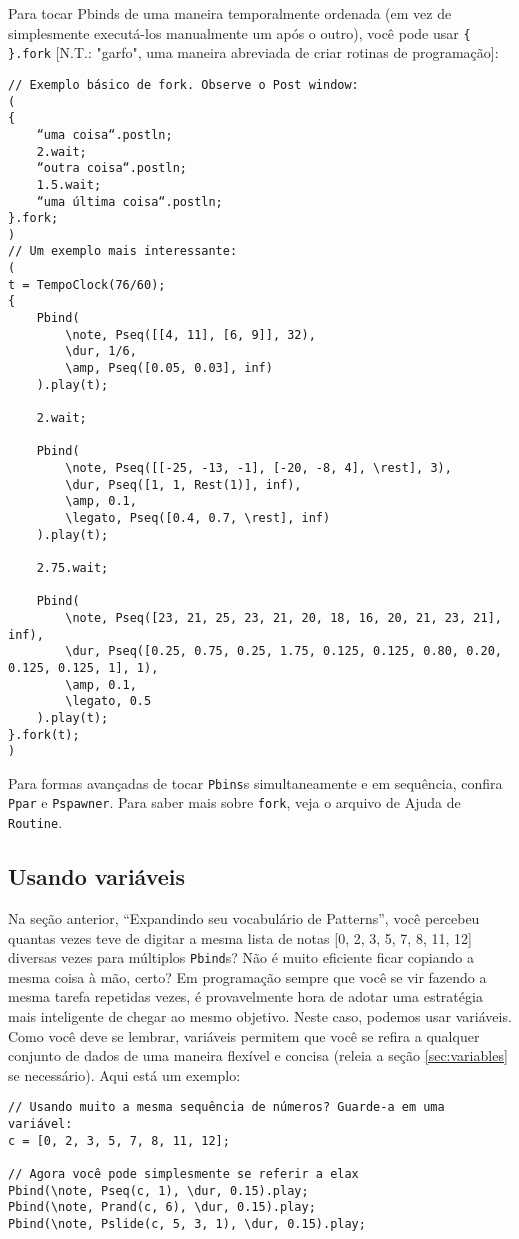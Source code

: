Para tocar Pbinds de uma maneira temporalmente ordenada (em vez de simplesmente executá-los manualmente um após o outro), você pode usar \texttt{\{ \}.fork} [N.T.: "garfo", uma maneira abreviada de criar rotinas de programação]:

\begin{lstlisting}[style=SuperCollider-IDE, basicstyle=\scttfamily\footnotesize]
// Exemplo básico de fork. Observe o Post window:
( 
{
	“uma coisa“.postln;
	2.wait;
	“outra coisa“.postln;
	1.5.wait;
	“uma última coisa“.postln;
}.fork;
)
// Um exemplo mais interessante:
(
t = TempoClock(76/60);
{
	Pbind(
		\note, Pseq([[4, 11], [6, 9]], 32),
		\dur, 1/6,
		\amp, Pseq([0.05, 0.03], inf)
	).play(t);
	
	2.wait;
	
	Pbind(
		\note, Pseq([[-25, -13, -1], [-20, -8, 4], \rest], 3),
		\dur, Pseq([1, 1, Rest(1)], inf),
		\amp, 0.1,
		\legato, Pseq([0.4, 0.7, \rest], inf)
	).play(t);

	2.75.wait;
	
	Pbind(
		\note, Pseq([23, 21, 25, 23, 21, 20, 18, 16, 20, 21, 23, 21], inf),
		\dur, Pseq([0.25, 0.75, 0.25, 1.75, 0.125, 0.125, 0.80, 0.20, 0.125, 0.125, 1], 1),
		\amp, 0.1,
		\legato, 0.5
	).play(t);
}.fork(t);
)
\end{lstlisting}
 
Para formas avançadas de tocar \texttt{Pbins}s simultaneamente e em sequência, confira \texttt{Ppar} e \texttt{Pspawner}. Para saber mais sobre \texttt{fork}, veja o arquivo de Ajuda de  \texttt{Routine}.

\subsection{Usando variáveis}

Na seção anterior, “Expandindo seu vocabulário de Patterns”, você percebeu quantas vezes teve de digitar a mesma lista de notas [0, 2, 3, 5, 7, 8, 11, 12] diversas vezes para múltiplos \texttt{Pbind}s? Não é muito eficiente ficar copiando a mesma coisa à mão, certo? Em programação sempre que você se vir fazendo a mesma tarefa repetidas vezes, é provavelmente hora de adotar uma estratégia mais inteligente de chegar ao mesmo objetivo. Neste caso, podemos usar variáveis. Como você deve se lembrar, variáveis permitem que você se refira a qualquer conjunto de dados de uma maneira flexível e concisa (releia a seção \ref{sec:variables} se necessário). Aqui está um exemplo:

\begin{lstlisting}[style=SuperCollider-IDE, basicstyle=\scttfamily\footnotesize]
// Usando muito a mesma sequência de números? Guarde-a em uma variável:
c = [0, 2, 3, 5, 7, 8, 11, 12];

// Agora você pode simplesmente se referir a elax
Pbind(\note, Pseq(c, 1), \dur, 0.15).play;
Pbind(\note, Prand(c, 6), \dur, 0.15).play;
Pbind(\note, Pslide(c, 5, 3, 1), \dur, 0.15).play;
\end{lstlisting}
 
